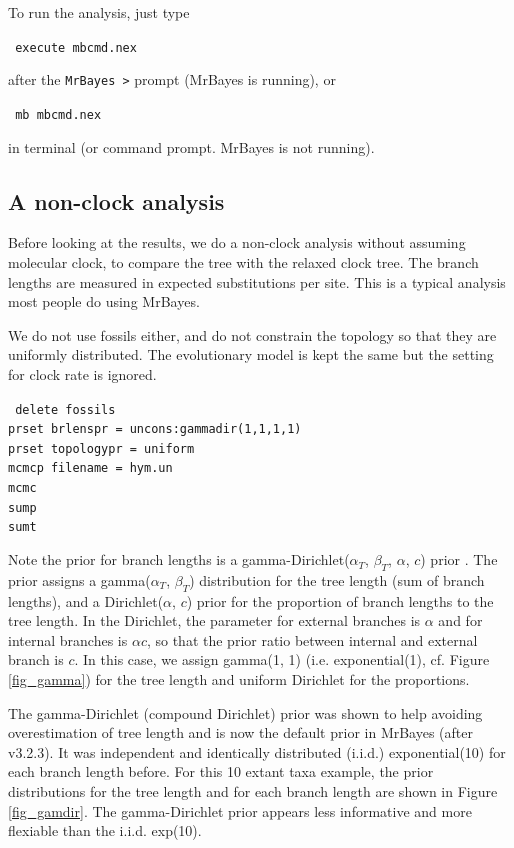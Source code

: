 \documentclass[12pt]{article}
\begin{document}
\noindent To run the analysis, just type

\medskip
{\tt \noindent \color{red} execute mbcmd.nex}
\medskip

\noindent after the {\tt MrBayes >} prompt (MrBayes is running), or

\medskip
{\tt \noindent \color{blue} mb mbcmd.nex}
\medskip

\noindent in terminal (or command prompt. MrBayes is not running).

\subsection{A non-clock analysis}

Before looking at the results, we do a non-clock analysis without assuming molecular clock, to compare the tree with the relaxed clock tree.
The branch lengths are measured in expected substitutions per site.
This is a typical analysis most people do using MrBayes.

We do not use fossils either, and do not constrain the topology so that they are uniformly distributed.
The evolutionary model is kept the same but the setting for clock rate is ignored. 

\medskip
{\tt \color{red} \noindent
delete fossils  \\
prset brlenspr = uncons:gammadir(1,1,1,1) \\
prset topologypr = uniform  \\
mcmcp filename = hym.un \\
mcmc  \\
sump  \\
sumt
}
\medskip

Note the prior for branch lengths is a gamma-Dirichlet($\alpha_T$, $\beta_T$, $\alpha$, $c$) prior \citep{Rannala:2012ke,Zhang:2012ke}.
The prior assigns a gamma($\alpha_T$, $\beta_T$) distribution for the tree length (sum of branch lengths), and a Dirichlet($\alpha$, $c$) prior for the proportion of branch lengths to the tree length.
In the Dirichlet, the parameter for external branches is $\alpha$ and for internal branches is $\alpha c$, so that the prior ratio between internal and external branch is $c$.
In this case, we assign gamma(1, 1) (i.e. exponential(1), cf. Figure \ref{fig_gamma}) for the tree length and uniform Dirichlet for the proportions.

The gamma-Dirichlet (compound Dirichlet) prior was shown to help avoiding overestimation of tree length \citep{Zhang:2012ke} and is now the default prior in MrBayes (after v3.2.3).
It was independent and identically distributed (i.i.d.) exponential(10) for each branch length before.
For this 10 extant taxa example, the prior distributions for the tree length and for each branch length are shown in Figure \ref{fig_gamdir}.
The gamma-Dirichlet prior appears less informative and more flexiable than the i.i.d. exp(10).
\end{document}
